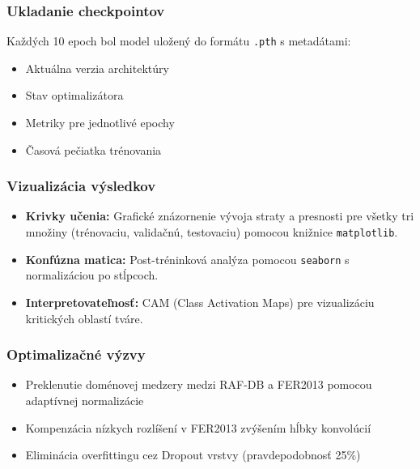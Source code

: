 \subsubsection{Ukladanie checkpointov}
Každých 10 epoch bol model uložený do formátu \texttt{.pth} s metadátami:
\begin{itemize}
    \item Aktuálna verzia architektúry
    \item Stav optimalizátora
    \item Metriky pre jednotlivé epochy
    \item Časová pečiatka trénovania
\end{itemize}

\subsubsection{Vizualizácia výsledkov}
\begin{itemize}
    \item \textbf{Krivky učenia:} Grafické znázornenie vývoja straty a presnosti pre všetky tri množiny (trénovaciu, validačnú, testovaciu) pomocou knižnice \texttt{matplotlib}.
    \item \textbf{Konfúzna matica:} Post-tréninková analýza pomocou \texttt{seaborn} s normalizáciou po stĺpcoch.
    \item \textbf{Interpretovateľnosť:} CAM (Class Activation Maps) pre vizualizáciu kritických oblastí tváre.
\end{itemize}


\subsubsection{Optimalizačné výzvy}
\begin{itemize}
    \item Preklenutie doménovej medzery medzi RAF-DB a FER2013 pomocou adaptívnej normalizácie
    \item Kompenzácia nízkych rozlíšení v FER2013 zvýšením hĺbky konvolúcií
    \item Eliminácia overfittingu cez Dropout vrstvy (pravdepodobnosť 25\%)
\end{itemize}

